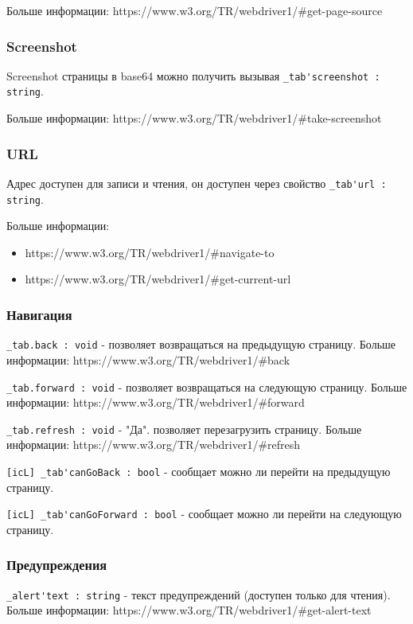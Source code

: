 \documentclass[a4paper, 14pt]{extarticle}
\newenvironment{icItems}
	{ \begin{itemize} [noitemsep,nolistsep] }
	{ \end{itemize} }
\begin{document}
Больше информации: https://www.w3.org/TR/webdriver1/\#get-page-source

\subsubsection{Screenshot}

Screenshot страницы в base64 можно получить вызывая \lstinline|_tab'screenshot : string|.

Больше информации: https://www.w3.org/TR/webdriver1/\#take-screenshot

\subsubsection{URL}

Адрес доступен для записи и чтения, он доступен через свойство \lstinline|_tab'url : string|.

Больше информации:
\begin{icItems}
\item https://www.w3.org/TR/webdriver1/\#navigate-to
\item https://www.w3.org/TR/webdriver1/\#get-current-url
\end{icItems}

\subsubsection{Навигация}

\lstinline|_tab.back : void| - позволяет возвращаться на предыдущую страницу. Больше информации: https://www.w3.org/TR/webdriver1/\#back

\lstinline|_tab.forward : void| - позволяет возвращаться на следующую страницу. Больше информации: https://www.w3.org/TR/webdriver1/\#forward

\lstinline|_tab.refresh : void| -  "Да". позволяет перезагрузить страницу. Больше информации: https://www.w3.org/TR/webdriver1/\#refresh

\lstinline|[icL] _tab'canGoBack : bool| - сообщает можно ли перейти на предыдущую страницу.

\lstinline|[icL] _tab'canGoForward : bool| - сообщает можно ли перейти на следующую страницу.


\subsubsection{Предупреждения}

\lstinline|_alert'text : string| - текст предупреждений (доступен только для чтения). Больше информации: https://www.w3.org/TR/webdriver1/\#get-alert-text
\end{document}
